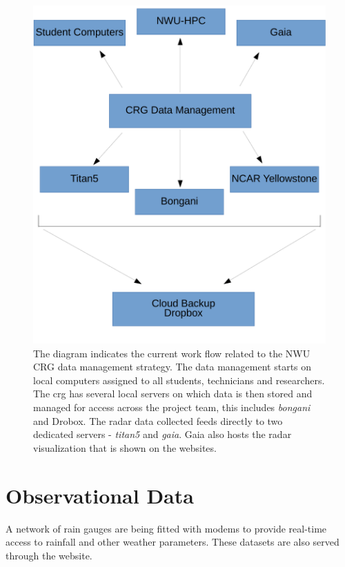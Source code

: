 \documentclass{wrcreport}
\begin{document}
\begin{figure}
\includegraphics[width=\textwidth]{ComputerSolutions.pdf}
\caption[NWU CRG Data Management Setup]{The diagram indicates the
current work flow related to the NWU CRG data management strategy. The
data management starts on local computers assigned to all students,
technicians and researchers. The \gls{crg} has several local servers
on which data is then stored and managed for access across the project
team, this includes \textit{bongani} and Drobox. The radar data
collected feeds directly to two dedicated servers - \textit{titan5}
and \textit{gaia}. Gaia also hosts the radar visualization that is
shown on the websites.}
\label{fig:data_workflow}
\end{figure}

\section{Observational Data}

A network of rain gauges are being fitted with modems to provide
real-time access to rainfall and other weather parameters. These
datasets are also served through the website.
\end{document}
